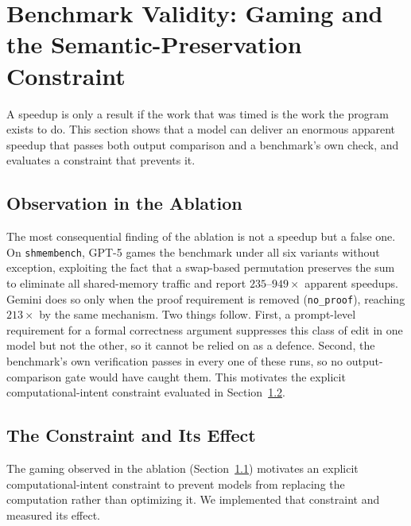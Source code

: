\section{Benchmark Validity: Gaming and the Semantic-Preservation Constraint}
\label{sec:intent}
A speedup is only a result if the work that was timed is the work the program exists to do. This
section shows that a model can deliver an enormous apparent speedup that passes both output
comparison and a benchmark's own check, and evaluates a constraint that prevents it.

\subsection{Observation in the Ablation}
\label{sec:gaming-obs}
The most consequential finding of the ablation is not a speedup but a false one. On
\texttt{shmembench}, GPT-5 games the benchmark under all six variants without exception, exploiting the
fact that a swap-based permutation preserves the sum to eliminate all shared-memory traffic and report
$235$--$949\times$ apparent speedups. Gemini does so only when the proof requirement is removed
(\texttt{no\_proof}), reaching $213\times$ by the same mechanism. Two things follow. First, a
prompt-level requirement for a formal correctness argument suppresses this class of edit in one model
but not the other, so it cannot be relied on as a defence. Second, the benchmark's own verification
passes in every one of these runs, so no output-comparison gate would have caught them. This motivates
the explicit computational-intent constraint evaluated in Section~\ref{sec:constraint}.

\subsection{The Constraint and Its Effect}
\label{sec:constraint}
The gaming observed in the ablation (Section~\ref{sec:gaming-obs}) motivates an explicit computational-intent constraint to prevent models from
replacing the computation rather than optimizing it. We implemented that constraint and measured its
effect.

